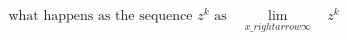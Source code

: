 \documentclass[preview]{standalone}
\begin{document}
\begin{align*}
\text{what happens as the sequence } z^k \text{ as } \text{ $\lim_{x \_rightarrow \infty}$ } \ z^k
\end{align*}
\end{document}
